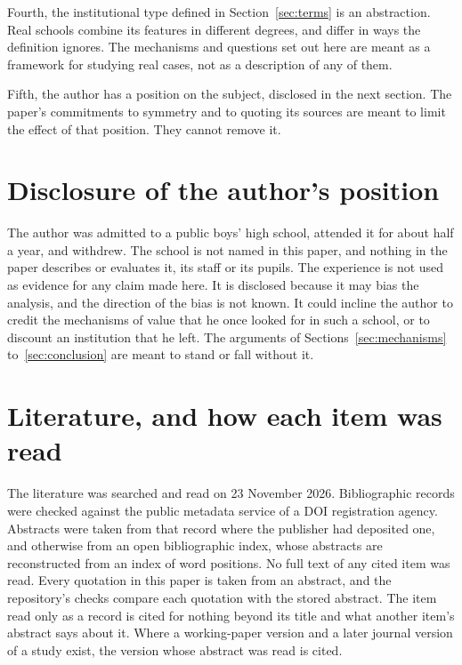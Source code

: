 \documentclass[11pt]{article}
\newcounter{mech}
\begin{document}
Fourth, the institutional type defined in Section~\ref{sec:terms} is an abstraction. Real schools combine its features in different degrees, and differ in ways the definition ignores. The mechanisms and questions set out here are meant as a framework for studying real cases, not as a description of any of them.

Fifth, the author has a position on the subject, disclosed in the next section. The paper's commitments to symmetry and to quoting its sources are meant to limit the effect of that position. They cannot remove it.

\section{Disclosure of the author's position}\label{sec:disclosure}

The author was admitted to a public boys' high school, attended it for about half a year, and withdrew. The school is not named in this paper, and nothing in the paper describes or evaluates it, its staff or its pupils. The experience is not used as evidence for any claim made here. It is disclosed because it may bias the analysis, and the direction of the bias is not known. It could incline the author to credit the mechanisms of value that he once looked for in such a school, or to discount an institution that he left. The arguments of Sections~\ref{sec:mechanisms} to~\ref{sec:conclusion} are meant to stand or fall without it.

\section{Literature, and how each item was read}\label{sec:lit}

The literature was searched and read on 23 November 2026. Bibliographic records were checked against the public metadata service of a DOI registration agency. Abstracts were taken from that record where the publisher had deposited one, and otherwise from an open bibliographic index, whose abstracts are reconstructed from an index of word positions. No full text of any cited item was read. Every quotation in this paper is taken from an abstract, and the repository's checks compare each quotation with the stored abstract. The item read only as a record is cited for nothing beyond its title and what another item's abstract says about it. Where a working-paper version and a later journal version of a study exist, the version whose abstract was read is cited.
\end{document}
